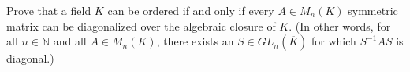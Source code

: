 Prove that a field $K$ can be ordered if and only if every $A\in M_n(K)$ symmetric matrix can be diagonalized over the algebraic closure of $K$. (In other words, for all $n\in\mathbb{N}$ and all $A\in M_n(K)$, there exists an $S\in GL_n(\overline{K})$ for which $S^{-1}AS$ is diagonal.)